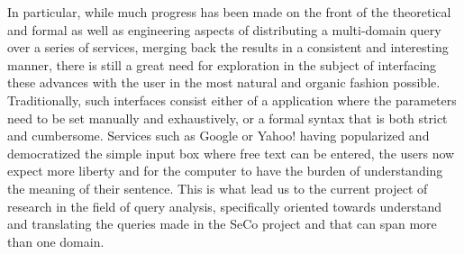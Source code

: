 In particular, while much progress has been made on the front of the theoretical and formal as well as engineering aspects of distributing a multi-domain query over a series of services, merging back the results in a consistent and interesting manner, there is still a great need for exploration in the subject of interfacing these advances with the user in the most natural and organic fashion possible. Traditionally, such interfaces consist either of a application where the parameters need to be set manually and exhaustively, or a formal syntax that is both strict and cumbersome. Services such as Google or Yahoo! having popularized and democratized the simple input box where free text can be entered, the users now expect more liberty and for the computer to have the burden of understanding the meaning of their sentence. This is what lead us to the current project of research in the field of query analysis, specifically oriented towards understand and translating the queries made in the SeCo project and that can span more than one domain.

